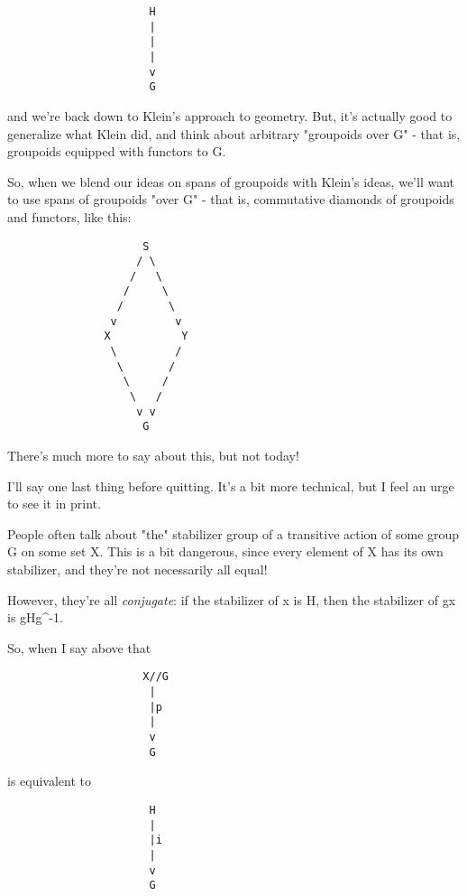 \begin{verbatim}
                      H
                      |
                      |
                      |
                      v
                      G
\end{verbatim}
    
and we're back down to Klein's approach to geometry.  But, it's actually 
good to generalize what Klein did, and think about arbitrary "groupoids
over G" - that is, groupoids equipped with functors to G.

So, when we blend our ideas on spans of groupoids with Klein's ideas,
we'll want to use spans of groupoids "over G" - that is,
commutative diamonds of groupoids and functors, like this:
  
\begin{verbatim}
                     S
                    / \
                   /   \
                  /     \
                 /       \
                v         v
               X           Y
                \         /
                 \       /
                  \     /
                   \   /
                    v v
                     G
\end{verbatim}
    
There's much more to say about this, but not today!

I'll say one last thing before quitting.  It's a bit more technical, 
but I feel an urge to see it in print.  

People often talk about "the" stabilizer group of a transitive action 
of some group G on some set X.  This is a bit dangerous, since every 
element of X has its own stabilizer, and they're not necessarily all equal!

However, they're all \emph{conjugate}: if the stabilizer of x is H, 
then the stabilizer of gx is gHg^{-1}.  

So, when I say above that 

\begin{verbatim}
                     X//G 
                      |
                      |p
                      |
                      v
                      G
\end{verbatim}
    
is equivalent to 

\begin{verbatim}
                      H
                      |
                      |i
                      |
                      v
                      G
\end{verbatim}
    
